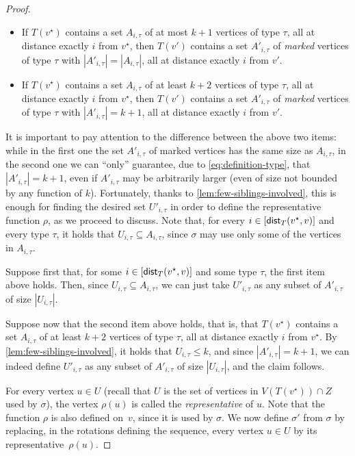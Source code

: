 \documentclass[a4paper,UKenglish,cleveref, autoref, thm-restate]{lipics-v2021}
\newenvironment{cproof}{\proof[Proof of claim]\renewcommand\qedsymbol{$\diamond$}}{\endproof}
\newcommand{\dist}{{\sf dist}\xspace}
\begin{document}
\begin{proof}
\begin{cproof}
\begin{itemize}
  \item If $T(v^{\star})$ contains a set $A_{i,\tau}$ of at most $k+1$ vertices of type $\tau$, all at distance exactly $i$ from $v^{\star}$, then $T(v')$ contains a set $A'_{i,\tau}$ of {\sl marked} vertices of type $\tau$ with $|A'_{i,\tau}|=|A_{i,\tau}|$, all at distance exactly $i$ from $v'$.
  \item If $T(v^{\star})$ contains a set $A_{i,\tau}$ of at least $k+2$ vertices of type $\tau$, all at distance exactly $i$ from $v^{\star}$, then $T(v')$ contains a set $A'_{i,\tau}$ of {\sl marked} vertices of type $\tau$ with $|A'_{i,\tau}|=k+1$, all at distance exactly $i$ from $v'$.
\end{itemize}

It is important to pay attention to the difference between the above two items: while in the first one the set $A'_{i,\tau}$ of marked vertices has the same size as $A_{i,\tau}$, in the second one we can ``only'' guarantee, due to \autoref{eq:definition-type}, that $|A'_{i,\tau}|=k+1$, even if $A'_{i,\tau}$ may be arbitrarily larger (even of size not bounded by any function of $k$). Fortunately, thanks to \autoref{lem:few-siblings-involved}, this is enough  for finding the desired set $U'_{i,\tau}$ in order to define the representative function $\rho$, as we proceed to discuss. Note that, for every $i \in [\dist_T(v^{\star},v)]$ and every type $\tau$, it holds that $U_{i,\tau} \subseteq A_{i,\tau}$, since $\sigma$ may use only some of the vertices in  $A_{i,\tau}$.

Suppose first that, for some $i \in [\dist_T(v^{\star},v)]$ and some type $\tau$, the first item above holds. Then, since $U_{i,\tau} \subseteq A_{i,\tau}$, we can just take $U'_{i,\tau}$ as any subset of $A'_{i,\tau}$ of size $|U_{i,\tau}|$.

Suppose now that the second item above holds, that is, that $T(v^{\star})$ contains a set $A_{i,\tau}$ of at least $k+2$ vertices of type $\tau$, all at distance exactly $i$ from $v^{\star}$. By \autoref{lem:few-siblings-involved}, it holds that $U_{i,\tau} \leq k$, and since $|A'_{i,\tau}|=k+1$, we can indeed define $U'_{i,\tau}$ as any subset of $A'_{i,\tau}$ of size $|U_{i,\tau}|$, and the claim follows.
\end{cproof}

For every vertex $u \in U$ (recall that $U$ is the set of vertices in $V(T(v^{\star})) \cap Z$ used by $\sigma$), the vertex $\rho(u)$ is called the \emph{representative} of $u$. Note that the function $\rho$ is also defined on~$v$, since it is used by $\sigma$. We now define $\sigma'$ from $\sigma$ by replacing, in the rotations defining the sequence, every vertex $u \in U$ by its representative~$\rho(u)$.


\end{proof}
\end{document}
